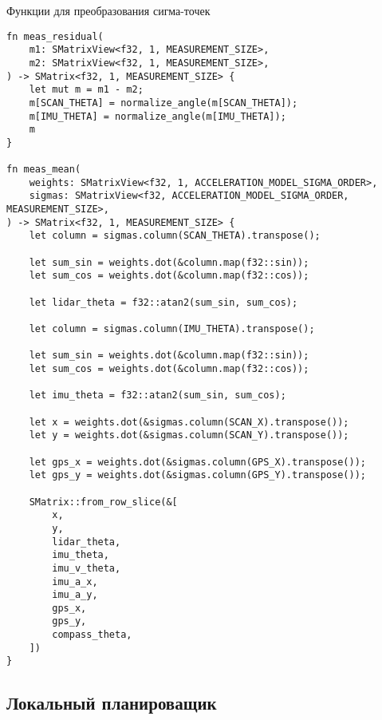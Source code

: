 Функции для преобразования сигма-точек
\begin{lstlisting}
fn meas_residual(
    m1: SMatrixView<f32, 1, MEASUREMENT_SIZE>,
    m2: SMatrixView<f32, 1, MEASUREMENT_SIZE>,
) -> SMatrix<f32, 1, MEASUREMENT_SIZE> {
    let mut m = m1 - m2;
    m[SCAN_THETA] = normalize_angle(m[SCAN_THETA]);
    m[IMU_THETA] = normalize_angle(m[IMU_THETA]);
    m
}

fn meas_mean(
    weights: SMatrixView<f32, 1, ACCELERATION_MODEL_SIGMA_ORDER>,
    sigmas: SMatrixView<f32, ACCELERATION_MODEL_SIGMA_ORDER, MEASUREMENT_SIZE>,
) -> SMatrix<f32, 1, MEASUREMENT_SIZE> {
    let column = sigmas.column(SCAN_THETA).transpose();

    let sum_sin = weights.dot(&column.map(f32::sin));
    let sum_cos = weights.dot(&column.map(f32::cos));

    let lidar_theta = f32::atan2(sum_sin, sum_cos);

    let column = sigmas.column(IMU_THETA).transpose();

    let sum_sin = weights.dot(&column.map(f32::sin));
    let sum_cos = weights.dot(&column.map(f32::cos));

    let imu_theta = f32::atan2(sum_sin, sum_cos);

    let x = weights.dot(&sigmas.column(SCAN_X).transpose());
    let y = weights.dot(&sigmas.column(SCAN_Y).transpose());

    let gps_x = weights.dot(&sigmas.column(GPS_X).transpose());
    let gps_y = weights.dot(&sigmas.column(GPS_Y).transpose());

    SMatrix::from_row_slice(&[
        x,
        y,
        lidar_theta,
        imu_theta,
        imu_v_theta,
        imu_a_x,
        imu_a_y,
        gps_x,
        gps_y,
        compass_theta,
    ])
}
\end{lstlisting}


\subsection{Локальный планироващик}


